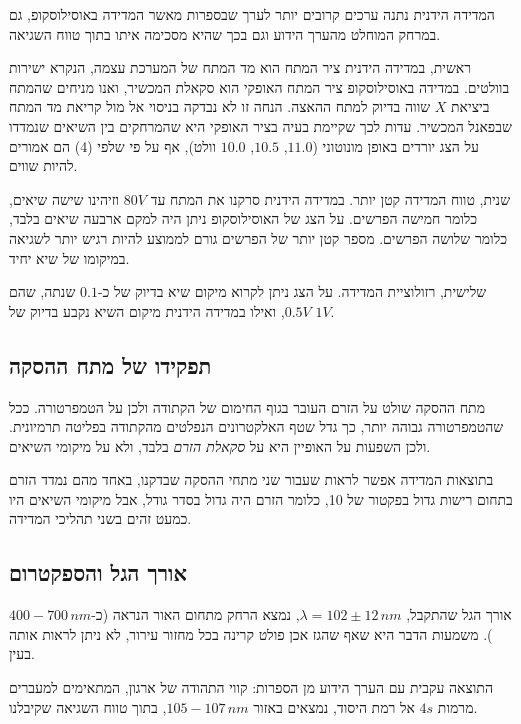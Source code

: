 \documentclass[14pt]{extarticle}
\begin{document}
המדידה הידנית נתנה ערכים קרובים יותר לערך שבספרות מאשר המדידה באוסילוסקופ, גם במרחק המוחלט
מהערך הידוע וגם בכך שהיא מסכימה איתו בתוך טווח השגיאה.

ראשית, במדידה הידנית ציר המתח הוא מד המתח של המערכת עצמה, הנקרא ישירות בוולטים. במדידה
באוסילוסקופ ציר המתח האופקי הוא סקאלת המכשיר, ואנו מניחים שהמתח ביציאת $X$ שווה בדיוק למתח
ההאצה. הנחה זו לא נבדקה בניסוי אל מול קריאת מד המתח שבפאנל המכשיר. עדות לכך שקיימת בעיה בציר האופקי היא שהמרחקים בין השיאים
שנמדדו על הצג יורדים באופן מונוטוני ($11.0$, $10.5$, $10.0$ וולט), אף על פי שלפי (4) הם אמורים
להיות שווים.

שנית, טווח המדידה קטן יותר. במדידה הידנית סרקנו את המתח עד $80V$ וזיהינו שישה שיאים,
כלומר חמישה הפרשים. על הצג של האוסילוסקופ ניתן היה למקם ארבעה שיאים בלבד, כלומר שלושה הפרשים. מספר קטן
יותר של הפרשים גורם לממוצע להיות רגיש יותר לשגיאה במיקומו של שיא יחיד.

שלישית, רזולוציית המדידה. על הצג ניתן לקרוא מיקום שיא בדיוק של כ-$0.1$ שנתה, שהם $0.5V$,
ואילו במדידה הידנית מיקום השיא נקבע בדיוק של $1V$.

\subsection*{תפקידו של מתח ההסקה}

מתח ההסקה שולט על הזרם העובר בגוף החימום של הקתודה ולכן על הטמפרטורה. ככל שהטמפרטורה גבוהה
יותר, כך גדל שטף האלקטרונים הנפלטים מהקתודה בפליטה תרמיונית. ולכן השפעות על האופיין היא על
\emph{סקאלת הזרם} בלבד, ולא על מיקומי השיאים.

בתוצאות המדידה אפשר לראות שעבור שני מתחי ההסקה שבדקנו, באחד מהם נמדד הזרם בתחום רישות גדול בפקטור של 10,
כלומר הזרם היה גדול בסדר גודל, אבל מיקומי השיאים היו כמעט זהים בשני תהליכי המדידה.

\subsection*{אורך הגל והספקטרום}

אורך הגל שהתקבל, $\lambda = 102 \pm 12\,nm$, נמצא הרחק מתחום האור הנראה (כ-$400-700\,nm$).
משמעות הדבר היא שאף שהגז אכן פולט קרינה בכל מחזור עירור, לא ניתן לראות אותה בעין.

התוצאה עקבית עם הערך הידוע מן הספרות: קווי התהודה של ארגון, המתאימים למעברים מרמות $4s$ אל רמת
היסוד, נמצאים באזור $105-107\,nm$, בתוך טווח השגיאה שקיבלנו.
\end{document}
